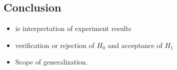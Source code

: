 \subsection{Conclusion}
\label{subsec:conclusion}

\begin{itemize}
	\item is interpretation of experiment results
	\item verification or rejection of $H_0$ and acceptance of $H_1$
	\item Scope of generalization.
\end{itemize}